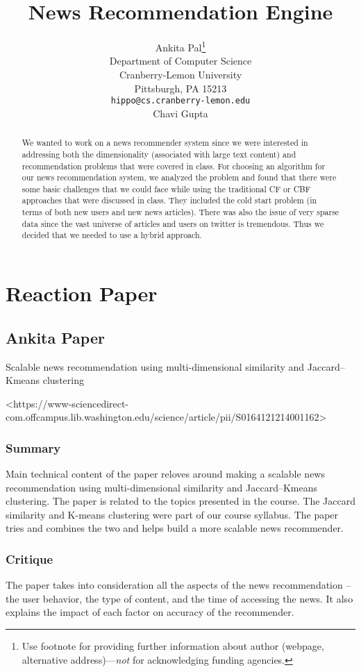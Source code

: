 \documentclass{article}
\title{News Recommendation Engine}
\author{%
  Ankita Pal\thanks{Use footnote for providing further information
    about author (webpage, alternative address)---\emph{not} for acknowledging
    funding agencies.} \\
  Department of Computer Science\\
  Cranberry-Lemon University\\
  Pittsburgh, PA 15213 \\
  \texttt{hippo@cs.cranberry-lemon.edu} \\
  \And
  Chavi Gupta\\
}
\begin{document}
\maketitle

\begin{abstract}
    We wanted to work on a news recommender system since we were interested in addressing both the dimensionality (associated with large text content) and recommendation problems that were covered in class. For choosing an algorithm for our news recommendation system, we analyzed the problem and found that there were some basic challenges that we could face while using the traditional CF or CBF approaches that were discussed in class. They included the cold start problem (in terms of both new users and new news articles). There was also the issue of very sparse data since the vast universe of articles and users on twitter is tremendous. Thus we decided that we needed to use a hybrid approach.
\end{abstract}

\section{Reaction Paper}

\subsection{Ankita Paper}
Scalable news recommendation using multi-dimensional similarity and Jaccard–Kmeans clustering

<\url{}{https://www-sciencedirect-com.offcampus.lib.washington.edu/science/article/pii/S0164121214001162}>
\subsubsection{Summary}
Main technical content of the paper reloves around making a scalable news recommendation using multi-dimensional similarity and Jaccard–Kmeans clustering. The paper is related to the topics presented in the course. The Jaccard similarity and K-means clustering were part of our course syllabus. The paper tries and combines the two and helps build a more scalable news recommender. 

\subsubsection{Critique}
The paper takes into consideration all the aspects of the news recommendation – the user behavior, the type of content, and the time of accessing the news. It also explains the impact of each factor on accuracy of the recommender. 
\end{document}
